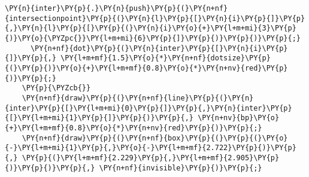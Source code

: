 \begin{Verbatim}[commandchars=\\\{\}]
      \PY{n}{inter}\PY{p}{.}\PY{n}{push}\PY{p}{(}\PY{n+nf}{intersectionpoint}\PY{p}{(}\PY{n}{l}\PY{p}{[}\PY{n}{i}\PY{p}{]}\PY{p}{,}\PY{n}{l}\PY{p}{[}\PY{p}{(}\PY{n}{i}\PY{o}{+}\PY{l+m+mi}{3}\PY{p}{)}\PY{o}{\PYZpc{}}\PY{l+m+mi}{6}\PY{p}{]}\PY{p}{)}\PY{p}{)}\PY{p}{;}
      \PY{n+nf}{dot}\PY{p}{(}\PY{n}{inter}\PY{p}{[}\PY{n}{i}\PY{p}{]}\PY{p}{,} \PY{l+m+mf}{1.5}\PY{o}{*}\PY{n+nf}{dotsize}\PY{p}{(}\PY{p}{)}\PY{o}{+}\PY{l+m+mf}{0.8}\PY{o}{*}\PY{n+nv}{red}\PY{p}{)}\PY{p}{;}
    \PY{p}{\PYZcb{}}
    \PY{n+nf}{draw}\PY{p}{(}\PY{n+nf}{line}\PY{p}{(}\PY{n}{inter}\PY{p}{[}\PY{l+m+mi}{0}\PY{p}{]}\PY{p}{,}\PY{n}{inter}\PY{p}{[}\PY{l+m+mi}{1}\PY{p}{]}\PY{p}{)}\PY{p}{,} \PY{n+nv}{bp}\PY{o}{+}\PY{l+m+mf}{0.8}\PY{o}{*}\PY{n+nv}{red}\PY{p}{)}\PY{p}{;}
    \PY{n+nf}{draw}\PY{p}{(}\PY{n+nf}{box}\PY{p}{(}\PY{p}{(}\PY{o}{-}\PY{l+m+mi}{1}\PY{p}{,}\PY{o}{-}\PY{l+m+mf}{2.722}\PY{p}{)}\PY{p}{,} \PY{p}{(}\PY{l+m+mf}{2.229}\PY{p}{,}\PY{l+m+mf}{2.905}\PY{p}{)}\PY{p}{)}\PY{p}{,} \PY{n+nf}{invisible}\PY{p}{)}\PY{p}{;}
\end{Verbatim}
